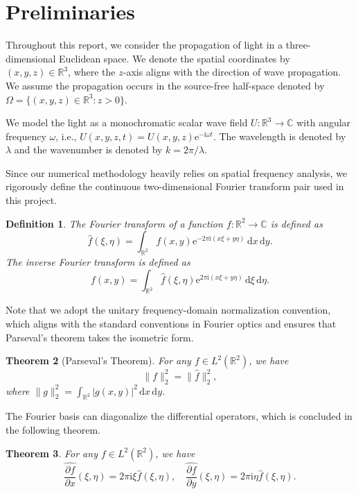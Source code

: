 \documentclass[12pt]{article}
\newtheorem{theorem}{Theorem}[section]
\newtheorem{definition}[theorem]{Definition}
\begin{document}
\section{Preliminaries}

Throughout this report, we consider the propagation of light in a three-dimensional Euclidean space.
We denote the spatial coordinates by \((x,y,z) \in \mathbb{R}^3\), where the \(z\)-axis aligns with the 
direction of wave propagation. We assume the propagation occurs in the source-free half-space denoted by
\( \Omega = \{ (x, y, z) \in \mathbb{R}^3: z > 0 \} \). 

We model the light as a monochromatic scalar wave field \( U: \mathbb{R}^3 \to \mathbb{C} \)
with angular frequency \( \omega \), i.e., \( U(x, y, z, t) = U(x, y, z) \mathrm{e}^{- \mathrm{i} \omega t} \).
The wavelength is denoted by \( \lambda \) and the wavenumber is denoted by \( k = 2\pi / \lambda \).

Since our numerical methodology heavily relies on spatial frequency analysis, we rigorously define the 
continuous two-dimensional Fourier transform pair used in this project.

\begin{definition}
    The Fourier transform of a function \( f: \mathbb{R}^2 \to \mathbb{C} \) is defined as
    \[
        \hat{f}(\xi, \eta) = \int_{\mathbb{R}^2} f(x, y) \mathrm{e}^{- 2\pi \mathrm{i} (x\xi + y\eta)}\,
        \mathrm{d}x \, \mathrm{d}y.
    \]
    The inverse Fourier transform is defined as
    \[
        f(x, y) = \int_{\mathbb{R}^2} \hat{f}(\xi, \eta) \mathrm{e}^{2\pi \mathrm{i} (x\xi + y\eta)}\,
        \mathrm{d}\xi \, \mathrm{d}\eta.
    \]
\end{definition}

Note that we adopt the unitary frequency-domain normalization convention, which aligns with the standard 
conventions in Fourier optics and ensures that Parseval's theorem takes the isometric form.

\begin{theorem}[Parseval's Theorem] \label{thm:Parseval}
    For any \( f \in L^2(\mathbb{R}^2) \), we have
    \[
        \|f\|_{2}^2 = \|\hat{f}\|_{2}^2,
    \]
    where \( \|g\|_{2}^2 = \int_{\mathbb{R}^2} |g(x, y)|^2 \, \mathrm{d}x \, \mathrm{d}y \).
\end{theorem}

The Fourier basis can diagonalize the differential operators, which is concluded in the following theorem.

\begin{theorem} \label{thm:diag}
    For any \( f \in L^2(\mathbb{R}^2) \), we have
    \[
        \widehat{\frac{\partial f}{\partial x}}(\xi, \eta) = 2\pi \mathrm{i} \xi \hat{f}(\xi, \eta), \quad
        \widehat{\frac{\partial f}{\partial y}}(\xi, \eta) = 2\pi \mathrm{i} \eta \hat{f}(\xi, \eta).
    \]
\end{theorem}
\end{document}
